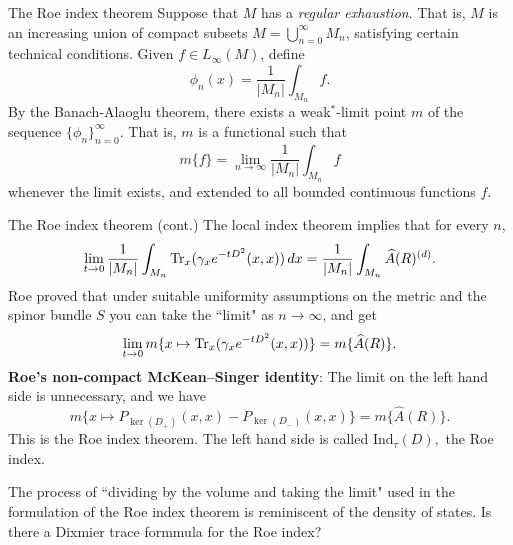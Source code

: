 \documentclass{beamer}
\numberwithin{equation}{section}
\theoremstyle{plain}
\theoremstyle{plain}
\theoremstyle{definition}
\theoremstyle{plain}
\theoremstyle{plain}
\theoremstyle{definition}
\newcommand{\tr}{{\rm Tr}}
\begin{document}
\begin{frame}{The Roe index theorem}
    Suppose that $M$ has a \emph{regular exhaustion}. That is, $M$ is an increasing union of compact subsets $M = \bigcup_{n=0}^\infty M_n$, satisfying certain technical conditions.
    Given $f\in L_\infty(M)$, define
    \begin{equation*}
        \phi_n(x) = \frac{1}{|M_n|}\int_{M_n} f.
    \end{equation*}
    By the Banach-Alaoglu theorem, there exists a weak$^*$-limit point $m$ of the sequence $\{\phi_n\}_{n=0}^\infty$. That is, $m$ is a functional such that
    \begin{equation*}
        m\{f\} = \lim_{n\to\infty} \frac{1}{|M_n|} \int_{M_n} f
    \end{equation*}
    whenever the limit exists, and extended to all bounded continuous functions $f$.
\end{frame}

\begin{frame}{The Roe index theorem (cont.)}
    The local index theorem implies that for every $n$,
    \begin{equation*}
        \lim_{t\to 0} \frac{1}{|M_n|}\int_{M_n}\tr_x(\gamma_xe^{-tD^2}(x,x))\,dx = \frac{1}{|M_n|}\int_{M_n} \widehat{A}(R)^{(d)}.
    \end{equation*}
    Roe proved that under suitable uniformity assumptions on the metric and the spinor bundle $S$ you can take the ``limit" as $n\to\infty$, and get
    \begin{equation*}
        \lim_{t\to 0} m\{x\mapsto \tr_x(\gamma_xe^{-tD^2}(x,x))\} = m\{\widehat{A}(R)\}.
    \end{equation*}
    \pause
    \textbf{Roe's non-compact McKean--Singer identity}: The limit on the left hand side is unnecessary, and we have
    \begin{equation*}
        m\{x\mapsto P_{\ker(D_+)}(x,x)-P_{\ker(D_-)}(x,x)\} = m\{\widehat{A}(R)\}.
    \end{equation*}
    This is the Roe index theorem. The left hand side is called $\mathrm{Ind}_{\tau}(D),$ the Roe index.
\end{frame}

\begin{frame}
    The process of ``dividing by the volume and taking the limit" used in the formulation of the Roe index theorem is reminiscent of the density of states. Is there a Dixmier trace formmula for the
    Roe index?
\end{frame}
\end{document}
